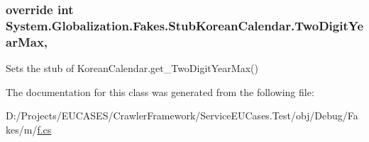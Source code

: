 \hypertarget{class_system_1_1_globalization_1_1_fakes_1_1_stub_korean_calendar_a2f2decc15ee8fe3475ba6a75cf1a4ac5}{
\subsubsection[{Two\-Digit\-Year\-Max}]{\setlength{\rightskip}{0pt plus 5cm}override int System.\-Globalization.\-Fakes.\-Stub\-Korean\-Calendar.\-Two\-Digit\-Year\-Max\hspace{0.3cm}{\ttfamily [get]}, {\ttfamily [set]}}}\label{class_system_1_1_globalization_1_1_fakes_1_1_stub_korean_calendar_a2f2decc15ee8fe3475ba6a75cf1a4ac5}


Sets the stub of Korean\-Calendar.\-get\-\_\-\-Two\-Digit\-Year\-Max()



The documentation for this class was generated from the following file\-:\begin{DoxyCompactItemize}
\item 
D\-:/\-Projects/\-E\-U\-C\-A\-S\-E\-S/\-Crawler\-Framework/\-Service\-E\-U\-Cases.\-Test/obj/\-Debug/\-Fakes/m/\hyperlink{m_2f_8cs}{f.\-cs}\end{DoxyCompactItemize}
